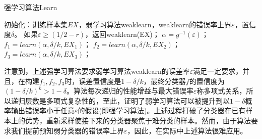         \begin{algorithm}[H]
            \caption{强学习算法Learn}\label{code:强学习算法}
            \begin{algorithmic}[1]
                \State 初始化：训练样本集$EX$，弱学习算法weaklearn，weaklearn的错误率上界$\varepsilon$，置信度$\delta$。
                \State 如果$\varepsilon \geqslant (1/2 - r)$，返回weaklearn(EX)；
                \State $\alpha = g^{-1}(\varepsilon)$；
                \State $f_1 = learn(\alpha,\delta/k,EX_1)$；
                \State $f_2 = learn(\alpha,\delta/k,EX_2)$；
                \State $f_3 = learn(\alpha,\delta/k,EX_3)$；
            \end{algorithmic}
        \end{algorithm}
        \par
        注意到，上述强学习算法要求弱学习算法weaklearn的误差率$\varepsilon$满足一定要求，并且，在构建$f_1,f_2,f_3$时，误差置信度是$1-\delta/k$，最终分类器$f$的置信度为$(1-\delta/k)^k > 1-\delta$。算法每次递归的性能增益与最大错误率$\varepsilon$称多项式关系，所以递归层数是多项式复杂性的，至此，证明了弱学习算法可以被提升到以$1-\delta$概率输出错误率小于任意$\varepsilon$的假设(即强学习算法)。上述过程打破了分类器在已有样本上的优势，重新采样使接下来的分类器聚焦于难分类的样本。然而，由于算法要求我们提前预知弱分类器的错误率上界$\varepsilon$，因此，在实际中上述算法很难应用。
